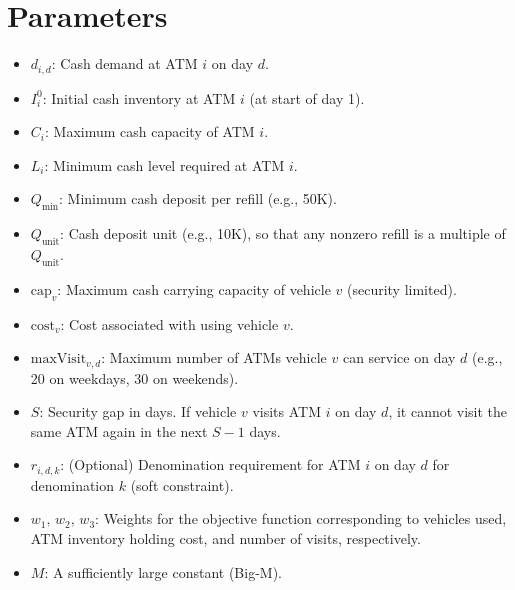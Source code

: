 \documentclass[11pt]{article}
\begin{document}
\section{Parameters}
\begin{itemize}[leftmargin=1.5cm]
    \item \(\displaystyle d_{i,d}\): Cash demand at ATM \(i\) on day \(d\).
    \item \(\displaystyle I_i^0\): Initial cash inventory at ATM \(i\) (at start of day 1).
    \item \(\displaystyle C_i\): Maximum cash capacity of ATM \(i\).
    \item \(\displaystyle L_i\): Minimum cash level required at ATM \(i\).
    \item \(\displaystyle Q_{\min}\): Minimum cash deposit per refill (e.g., 50K).
    \item \(\displaystyle Q_{\text{unit}}\): Cash deposit unit (e.g., 10K), so that any nonzero refill is a multiple of \(Q_{\text{unit}}\).
    \item \(\displaystyle \text{cap}_v\): Maximum cash carrying capacity of vehicle \(v\) (security limited).
    \item \(\displaystyle \text{cost}_v\): Cost associated with using vehicle \(v\).
    \item \(\displaystyle \text{maxVisit}_{v,d}\): Maximum number of ATMs vehicle \(v\) can service on day \(d\) (e.g., 20 on weekdays, 30 on weekends).
    \item \(\displaystyle S\): Security gap in days. If vehicle \(v\) visits ATM \(i\) on day \(d\), it cannot visit the same ATM again in the next \(S-1\) days.
    \item \(\displaystyle r_{i,d,k}\): (Optional) Denomination requirement for ATM \(i\) on day \(d\) for denomination \(k\) (soft constraint).
    \item \(\displaystyle w_1,\, w_2,\, w_3\): Weights for the objective function corresponding to vehicles used, ATM inventory holding cost, and number of visits, respectively.
    \item \(\displaystyle M\): A sufficiently large constant (Big-M).
\end{itemize}
\end{document}
